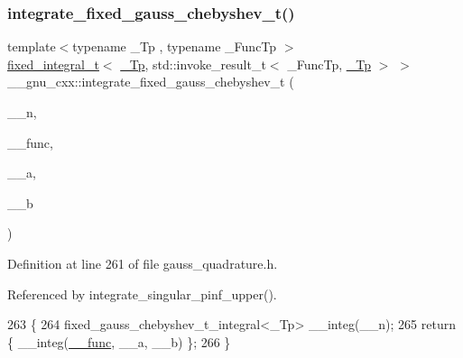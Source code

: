 \subsubsection{\texorpdfstring{integrate\+\_\+fixed\+\_\+gauss\+\_\+chebyshev\+\_\+t()}{integrate\_fixed\_gauss\_chebyshev\_t()}}
{\footnotesize\ttfamily template$<$typename \+\_\+\+Tp , typename \+\_\+\+Func\+Tp $>$ \\
\hyperlink{struct____gnu__cxx_1_1fixed__integral__t}{fixed\+\_\+integral\+\_\+t}$<$ \hyperlink{namespace____gnu__cxx_a3b19a9c800ca194374ef9172290f7d79}{\+\_\+\+Tp}, std\+::invoke\+\_\+result\+\_\+t$<$ \+\_\+\+Func\+Tp, \hyperlink{namespace____gnu__cxx_a3b19a9c800ca194374ef9172290f7d79}{\+\_\+\+Tp} $>$ $>$ \+\_\+\+\_\+gnu\+\_\+cxx\+::integrate\+\_\+fixed\+\_\+gauss\+\_\+chebyshev\+\_\+t (\begin{DoxyParamCaption}\item[{int}]{\+\_\+\+\_\+n,  }\item[{\+\_\+\+Func\+Tp}]{\+\_\+\+\_\+func,  }\item[{\hyperlink{namespace____gnu__cxx_a3b19a9c800ca194374ef9172290f7d79}{\+\_\+\+Tp}}]{\+\_\+\+\_\+a,  }\item[{\hyperlink{namespace____gnu__cxx_a3b19a9c800ca194374ef9172290f7d79}{\+\_\+\+Tp}}]{\+\_\+\+\_\+b }\end{DoxyParamCaption})}



Definition at line 261 of file gauss\+\_\+quadrature.\+h.



Referenced by integrate\+\_\+singular\+\_\+pinf\+\_\+upper().


\begin{DoxyCode}
263     \{
264       fixed\_gauss\_chebyshev\_t\_integral<\_Tp> \_\_integ(\_\_n);
265       \textcolor{keywordflow}{return} \{ \_\_integ(\hyperlink{namespace____gnu__cxx_af2b2f0c7a2ae72b922b1afefae5a65b2}{\_\_func}, \_\_a, \_\_b) \};
266     \}
\end{DoxyCode}
\mbox{\label{namespace____gnu__cxx_a38001a3f61a4fc4757b038d3db0180ca}} 
